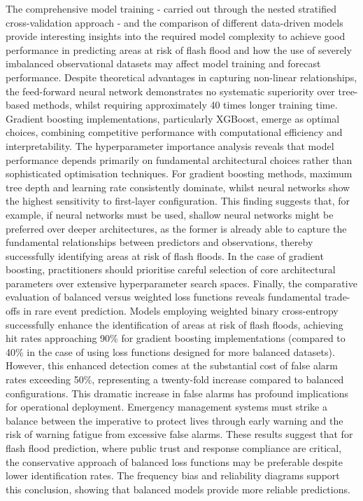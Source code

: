 The  comprehensive model training - carried out through the nested stratified cross-validation approach - and the comparison of different data-driven models provide interesting insights into the required model complexity to achieve good performance in predicting areas at risk of flash flood and how the use of severely imbalanced observational datasets may affect model training and forecast performance. Despite theoretical advantages in capturing non-linear relationships, the feed-forward neural network demonstrates no systematic superiority over tree-based methods, whilst requiring approximately 40 times longer training time. Gradient boosting implementations, particularly XGBoost, emerge as optimal choices, combining competitive performance with computational efficiency and interpretability. The hyperparameter importance analysis reveals that model performance depends primarily on fundamental architectural choices rather than sophisticated optimisation techniques. For gradient boosting methods, maximum tree depth and learning rate consistently dominate, whilst neural networks show the highest sensitivity to first-layer configuration. This finding suggests that, for example, if neural networks must be used, shallow neural networks might be preferred over deeper architectures, as the former is already able to capture the fundamental relationships between predictors and observations, thereby successfully identifying areas at risk of flash floods. In the case of gradient boosting, practitioners should prioritise careful selection of core architectural parameters over extensive hyperparameter search spaces. Finally, the comparative evaluation of balanced versus weighted loss functions reveals fundamental trade-offs in rare event prediction. Models employing weighted binary cross-entropy successfully enhance the identification of areas at risk of flash floods, achieving hit rates approaching 90\% for gradient boosting implementations (compared to 40\% in the case of using loss functions designed for more balanced datasets). However, this enhanced detection comes at the substantial cost of false alarm rates exceeding 50\%, representing a twenty-fold increase compared to balanced configurations. This dramatic increase in false alarms has profound implications for operational deployment. Emergency management systems must strike a balance between the imperative to protect lives through early warning and the risk of warning fatigue from excessive false alarms. These results suggest that for flash flood prediction, where public trust and response compliance are critical, the conservative approach of balanced loss functions may be preferable despite lower identification rates. The frequency bias and reliability diagrams support this conclusion, showing that balanced models provide more reliable predictions.

